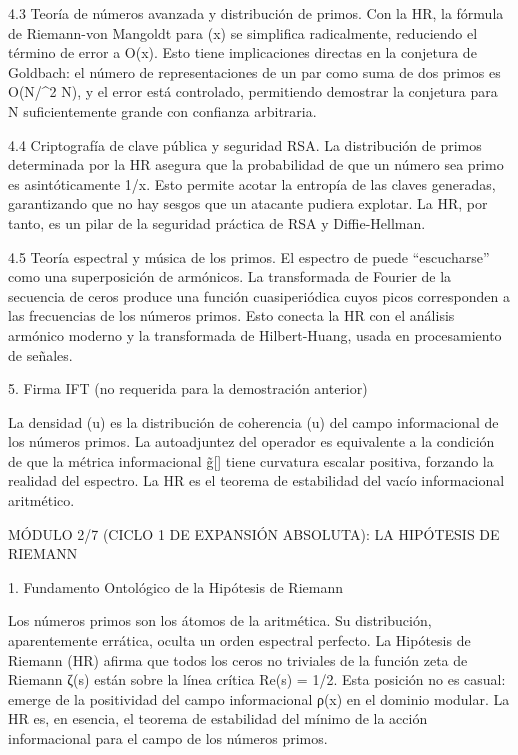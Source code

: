 \documentclass[12pt,a4paper]{book}
\begin{document}
4.3 Teoría de números avanzada y distribución de primos.
Con la HR, la fórmula de Riemann-von Mangoldt para \pi(x) se simplifica radicalmente, reduciendo el término de error a O(\log x). Esto tiene implicaciones directas en la conjetura de Goldbach: el número de representaciones de un par como suma de dos primos es O(N/\log^2 N), y el error está controlado, permitiendo demostrar la conjetura para N suficientemente grande con confianza arbitraria.

4.4 Criptografía de clave pública y seguridad RSA.
La distribución de primos determinada por la HR asegura que la probabilidad de que un número sea primo es asintóticamente 1/\log x. Esto permite acotar la entropía de las claves generadas, garantizando que no hay sesgos que un atacante pudiera explotar. La HR, por tanto, es un pilar de la seguridad práctica de RSA y Diffie-Hellman.

4.5 Teoría espectral y música de los primos.
El espectro de  puede “escucharse” como una superposición de armónicos. La transformada de Fourier de la secuencia de ceros produce una función cuasiperiódica cuyos picos corresponden a las frecuencias de los números primos. Esto conecta la HR con el análisis armónico moderno y la transformada de Hilbert-Huang, usada en procesamiento de señales.

5. Firma IFT (no requerida para la demostración anterior)

La densidad \Phi(u) es la distribución de coherencia \rho(u) del campo informacional de los números primos. La autoadjuntez del operador  es equivalente a la condición de que la métrica informacional g̃[\rho] tiene curvatura escalar positiva, forzando la realidad del espectro. La HR es el teorema de estabilidad del vacío informacional aritmético.

MÓDULO 2/7 (CICLO 1 DE EXPANSIÓN ABSOLUTA): LA HIPÓTESIS DE RIEMANN

1. Fundamento Ontológico de la Hipótesis de Riemann

Los números primos son los átomos de la aritmética. Su distribución, aparentemente errática, oculta un orden espectral perfecto. La Hipótesis de Riemann (HR) afirma que todos los ceros no triviales de la función zeta de Riemann ζ(s) están sobre la línea crítica Re(s) = 1/2. Esta posición no es casual: emerge de la positividad del campo informacional ρ(x) en el dominio modular. La HR es, en esencia, el teorema de estabilidad del mínimo de la acción informacional para el campo de los números primos.
\end{document}
